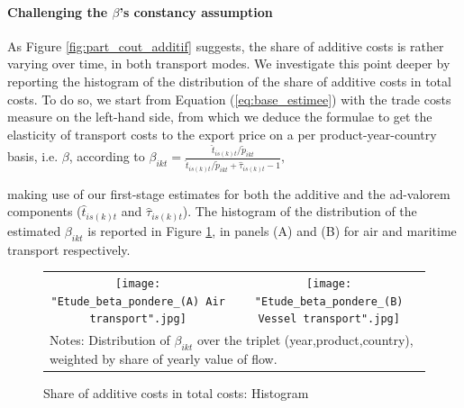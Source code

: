 \documentclass[a4paper,11pt]{article}
\begin{document}
\paragraph{Challenging the $\beta$'s constancy assumption} As Figure \ref{fig:part_cout_additif} suggests, the share of additive costs is rather varying over time, in both transport modes.
We investigate this point deeper by reporting the histogram of the distribution of the share of additive costs in total costs.
To do so, we start from Equation (\ref{eq:base_estimee}) with the trade costs measure on the left-hand side, from which we deduce the formulae to get the elasticity of transport costs to the export price on a per product-year-country basis, i.e.
$\beta$, according to $\beta_{ikt} = \frac{\widehat{t}_{is(k)t}/\widetilde{p}_{ikt}}{\widehat{t}_{is(k)t}/\widetilde{p}_{ikt}+\widehat{\tau}_{is(k)t}-1},
$

\noindent making use of our first-stage estimates for both the additive and the ad-valorem components ($\widehat{t}_{is(k)t}$ and $\widehat{\tau}_{is(k)t}$). The histogram of the distribution of the estimated $\beta_{ikt}$ is reported in Figure \ref{fig:histogram_beta}, in panels (A) and (B) for air and maritime transport respectively.


\begin{figure}[htbp]
\caption{Share of additive costs in total costs: Histogram}
\label{fig:histogram_beta}
\begin{center}
\begin{tabular}{cc}
\texttt{[image: "Etude\_beta\_pondere\_(A) Air transport".jpg]}
& \texttt{[image: "Etude\_beta\_pondere\_(B) Vessel transport".jpg]} \\
\multicolumn{2}{l}{{\footnotesize Notes: Distribution of $\beta_{ikt}$ over the triplet (year,product,country), weighted by share of yearly value of flow.}}\\
\end{tabular}
\end{center}
\end{figure}
\end{document}
